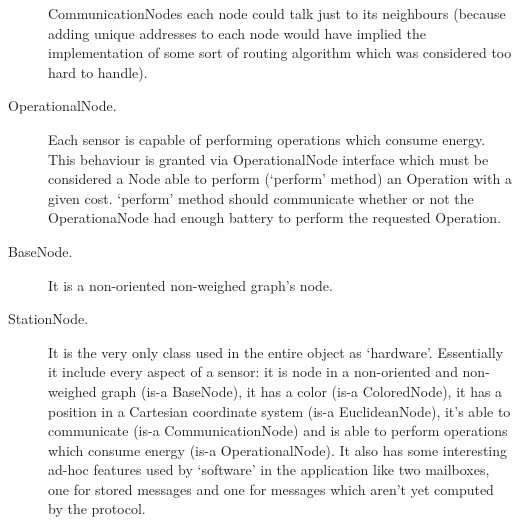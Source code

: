 \begin{description}
  CommunicationNodes each node could talk just to its neighbours (because
  adding unique addresses to each node would have implied the implementation
  of some sort of routing algorithm which was considered too hard to handle).
  \item [OperationalNode.] Each sensor is capable of performing 
  operations which consume energy. This behaviour is granted via 
  OperationalNode interface which must be considered a Node able to perform
  (`perform' method) an Operation with a given cost. `perform' method should communicate
  whether or not the OperationaNode had enough battery to perform the requested
  Operation.
  \item [BaseNode.] It is a non-oriented non-weighed graph's node.
  \item [StationNode.] It is the very only class used in the entire object
  as `hardware'. Essentially it include every aspect of a sensor:
  it is node in a non-oriented and non-weighed graph (is-a BaseNode), 
  it has a color (is-a ColoredNode), it has a position in a 
  Cartesian coordinate system (is-a EuclideanNode), it's able to communicate
  (is-a CommunicationNode) and is able to perform operations which consume 
  energy (is-a OperationalNode). It also has some interesting ad-hoc features
  used by `software' in the application like two mailboxes, one for stored 
  messages and one for messages which aren't yet computed by the protocol.
\end{description}

